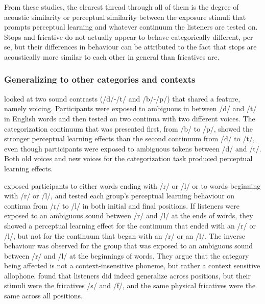 \documentclass[11pt]{article} %
\begin{document}
From these studies, the clearest thread through all of them is the degree of acoustic similarity or perceptual similarity between the exposure stimuli that prompts perceptual learning and whatever continuum the listeners are tested on.  
Stops and fricative do not actually appear to behave categorically different, per se, but their differences in behaviour can be attributed to the fact that stops are acoustically more similar to each other in general than fricatives are.

\subsubsection{Generalizing to other categories and contexts}

\citet{Kraljic2006} looked at two sound contrasts (/d/-/t/ and /b/-/p/) that shared a feature, namely voicing.  
Participants were exposed to ambiguous in between /d/ and /t/ in English words and then tested on two continua with two different voices.  
The categorization continuum that was presented first, from /b/ to /p/, showed the stronger perceptual learning effects than the second continuum from /d/ to /t/, even though participants were exposed to ambiguous tokens between /d/ and /t/. 
 Both old voices and new voices for the categorization task produced perceptual learning effects.

\citet{Mitterer2013} exposed participants to either words ending with /r/ or /l/ or to words beginning with /r/ or /l/, and tested each group's perceptual learning behaviour on continua from /r/ to /l/ in both initial and final positions.  
If listeners were exposed to an ambiguous sound between /r/ and /l/ at the ends of words, they showed a perceptual learning effect for the continuum that ended with an /r/ or /l/, but not for the continuum that began with an /r/ or an /l/.  
The inverse behaviour was observed for the group that was exposed to an ambiguous sound between /r/ and /l/ at the beginnings of words.  
They argue that the category being affected is not a context-insensitive phoneme, but rather a context sensitive allophone.  
\citet{Jesse2011} found that listeners did indeed generalize across positions, but their stimuli were the fricatives /s/ and /f/, and the same physical fricatives were the same across all positions.

\end{document}
